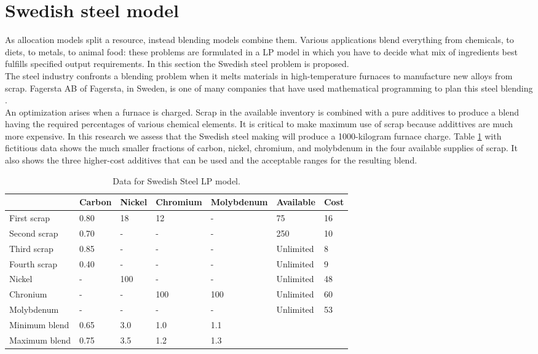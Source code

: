 \documentclass[a4paper,10 pt,titlepage,twoside]{book}
\theoremstyle{plain}
\theoremstyle{definition}
\theoremstyle{remark}
\begin{document}
\section{Swedish steel model}
As allocation models split a resource, instead blending models combine them. Various applications blend everything from chemicals, to diets, to metals, to animal food: these problems are formulated in a LP model in which you have to decide what mix of ingredients best fulfills specified output requirements. In this section the Swedish steel problem is proposed.\\
The steel industry confronts a blending problem when it melts materials in high-temperature furnaces to manufacture new alloys from scrap. Fagersta AB of Fagersta, in Sweden, is one of many companies that have used mathematical programming to plan this steel blending \cite{SSM}.\\
An optimization arises when a furnace is charged. Scrap in the available inventory is combined with a pure additives to produce a blend having the required percentages of various chemical elements. It is critical to make maximum use of scrap because addittives are much more expensive. In this research we assess that the Swedish steel making will produce a 1000-kilogram furnace charge. Table \ref{table:carbon} with fictitious data shows the much smaller fractions of carbon, nickel, chromium, and molybdenum in the four available supplies of scrap. It also shows the three higher-cost additives that can be used and the acceptable ranges for the resulting blend.\\
\begin{table}[h]\caption{\label{table:carbon}Data for Swedish Steel LP model.}
\begin{center}
	\begin{tabular}{@{}lllllll@{}}
		\toprule
		& Carbon & Nickel & Chromium & Molybdenum & Available & Cost \\ \midrule
		First scrap   & 0.80   & 18     & 12       & -          & 75        & 16   \\
		Second scrap  & 0.70   & -      & -        & -          & 250       & 10   \\
		Third scrap   & 0.85   & -      & -        & -          & Unlimited & 8    \\
		Fourth scrap  & 0.40   & -      & -        & -          & Unlimited & 9    \\
		Nickel        & -      & 100    & -        & -          & Unlimited & 48   \\
		Chronium      & -      & -      & 100      & 100        & Unlimited & 60   \\
		Molybdenum    & -      & -      & -        & -          & Unlimited & 53   \\ \midrule
		Minimum blend & 0.65   & 3.0    & 1.0      & 1.1        &           &      \\ 
		Maximum blend & 0.75   & 3.5    & 1.2      & 1.3        &           &      \\ \midrule
	\end{tabular}
\end{center}
\end{table}
\end{document}
